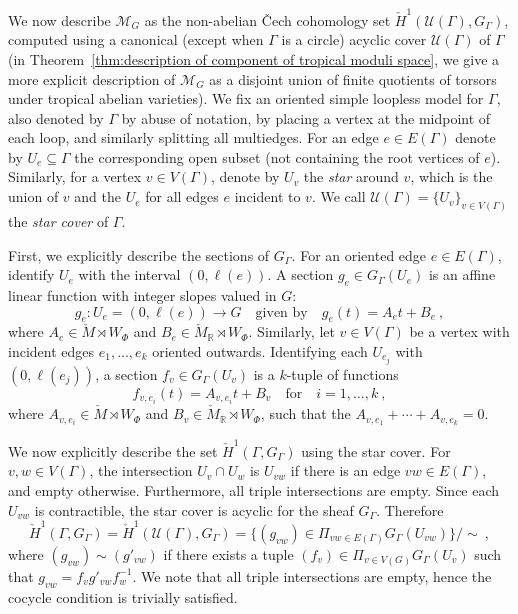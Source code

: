 \documentclass[10pt, a4paper]{amsart}
\theoremstyle{definition}
\theoremstyle{myitemstyle}
\newcommand{\RR}{\mathbb{R}}
\newcommand{\Mcheck}{{\check{M}}}
\newcommand{\calU}{\mathcal{U}}
\newcommand{\mc}[1]{{\mathcal{#1}}}
\newcommand{\Ga}{\Gamma}
\begin{document}
We now describe $\mc M_G$ as the non-abelian \v{C}ech cohomology set $\check{H}^1(\calU(\Ga),G_{\Ga})$, computed using a canonical (except when $\Ga$ is a circle) acyclic cover $\calU(\Ga)$ of $\Ga$ (in Theorem~\ref{thm:description of component of tropical moduli space}, we give a more explicit description of $\mc M_G$ as a disjoint union of finite quotients of torsors under tropical abelian varieties). We fix an oriented simple loopless model for $\Gamma$, also denoted by $\Gamma$ by abuse of notation, by placing a vertex at the midpoint of each loop, and similarly splitting all multiedges. For an edge $e\in E(\Ga)$ denote by $U_e\subseteq \Gamma$ the corresponding open subset (not containing the root vertices of $e$). Similarly, for a vertex $v\in V(\Ga)$, denote by $U_v$ the \emph{star} around $v$, which is the union of $v$ and the $U_e$ for all edges $e$ incident to $v$. We call $\calU(\Gamma) = \{U_v\}_{v \in V(\Gamma)}$ the \emph{star cover} of $\Gamma$. 

First, we explicitly describe the sections of $G_{\Gamma}$. For an oriented edge $e\in E(\Ga)$, identify $U_e$ with the interval $(0,\ell(e))$. A section $g_e\in G_{\Gamma}(U_e)$ is an affine linear function with integer slopes valued in $G$:
\[
g_e:U_e=(0,\ell(e))\longrightarrow G \quad \text{given by}\quad g_e(t)=A_et+B_e\ ,
\]
where $A_e\in \Mcheck \rtimes W_{\Phi}$ and $B_e\in \Mcheck_{\RR}\rtimes W_{\Phi}$.
Similarly, let $v\in V(\Gamma)$ be a vertex with incident edges $e_1,\ldots,e_k$ oriented outwards. Identifying each $U_{e_j}$ with $(0,\ell(e_j))$, a section $f_v\in G_{\Gamma}(U_v)$ is a $k$-tuple of functions
\[
f_{v,e_i}(t)=A_{v,e_i}t+B_v\quad\text{for}\quad i=1,\ldots,k \ ,
\]
where $A_{v,e_i}\in \Mcheck\rtimes W_{\Phi}$ and $B_v\in \Mcheck_{\RR}\rtimes W_{\Phi}$, 
such that the $A_{v,e_1}+\cdots+A_{v,e_k}=0$. 

We now explicitly describe the set $\check{H}^1(\Gamma,G_{\Gamma})$ using the star cover. For $v,w\in V(\Gamma)$, the intersection $U_v\cap U_w$ is $U_{vw}$ if there is an edge $vw\in E(\Gamma)$, and empty otherwise. Furthermore, all triple intersections are empty. Since each $U_{vw}$ is contractible, the star cover is acyclic for the sheaf $G_{\Gamma}$. Therefore
\[
    \check H^1(\Ga,G_\Ga)=\check H^1(\mc U(\Gamma), G_{\Gamma}) = \big\{(g_{vw}) \in \Pi_{vw\in E(\Gamma)} G_{\Gamma}(U_{vw})\big\} / \sim \ ,
\]
where $(g_{vw}) \sim (g'_{vw})$ if there exists a tuple $(f_v) \in \Pi_{v \in V(G)} G_{\Gamma}(U_v)$ such that $g_{vw} = f_v g'_{vw} f_w^{-1}$. We note that all triple intersections are empty, hence the cocycle condition is trivially satisfied.
\end{document}
